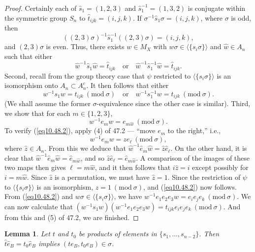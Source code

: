 \documentclass{surv-l}
\numberwithin{equation}{section}
\numberwithin{table}{section}
\numberwithin{figure}{section}
\newtheorem{lemma}[equation]{Lemma}
\theoremstyle{definition}
\begin{document}
\begin{proof}Certainly each of $\widehat{s}_{1}=(1,2,3)$ and
$\widehat{s}_{1}^{-1}=(1,3,2)$ is conjugate within the symmetric
group $S_{n}$ to $\widehat{t}_{ijk}=(i,j, k)$. If
$\sigma^{-1}\widehat{s}_{1}\sigma=(i, j, k)$, where $\sigma$ is
odd, then
\[
((2,3)\sigma)^{-1}\widehat{s}_{1}^{-1}((2,3)\sigma)=(i,j, k),
\]
and $(2,3)\sigma$ is even. Thus, there exists $w\in M_{X}$ with $
w\sigma\in\langle\{s_{i}\sigma\}\rangle$ and $\widehat{w}\in
A_{n}$ such that either
\[
\widehat{w}^{-1}\widehat{s}_{1}\widehat{w}=\widehat{t}_{ijk}\quad \mathrm{or}\quad \widehat{w}^{-1}
\widehat{s}_{1}^{-1}\widehat{w}=\widehat{t}_{ijk}.
\]
Second, recall from the group theory case that $\psi$ restricted
to $\langle\{s_{i}\sigma\}\rangle$ is an isomorphism onto
$A_{n}\subset A_{n}^{c}$. It then follows that either
\[
w^{-1}s_{1}w=t_{ijk}\ (\mathrm{mod}\ \sigma)\quad \mathrm{or}\quad w^{-1}s_{1}^{-1}w=t_{ijk}\ (\mathrm{mod}\ \sigma).
\]
(We shall assume the former $\sigma$-equivalence since the other
case is similar). Third, we show that for each $m\in\{1,2,3\}$,
\begin{equation}\label{eq10.48.2}
 w^{-1}e_{m}w=e_{m\widehat{w}}\ (\mathrm{mod}\ \sigma).
\end{equation}
To verify (\ref{eq10.48.2}), apply (4) of 47.2 --- ``move $e_{m}$
to the right,'' i.e.,
\[
w^{-1}e_{m}w=ze_{\ell}\ (\mathrm{mod}\ \sigma),
\]
where $\widehat{z}\in A_{n}$. From this we deduce that
$\widehat{w}^{-1}\widehat{e}_{m}\widehat{w}=\widehat{z}\widehat{e}_{\ell}$.
On the other hand, it is clear that
$\widehat{w}^{-1}\widehat{e}_{m}\widehat{w}=\widehat{e}_{m\widehat{w}}$,
and so $\widehat{z}\widehat{e}_{\ell}=\widehat{e}_{m\widehat{w}}$.
A comparison of the images of these two maps then gives
$\ell=m\widehat{w}$, and it then follows that $i\widehat{z}=i$
except possibly for $i=m\widehat{w}$. Since $\widehat{z}$ is a
permutation, we must have $\widehat{z}=1$. Since the restriction
of $\psi$ to $\langle\{s_{i}\sigma\}\rangle$ is an isomorphism,
$z=1\ (\mathrm{mod}\ \sigma)$, and (\ref{eq10.48.2}) now follows.
From (\ref{eq10.48.2}) and
$w\sigma\in\langle\{s_{i}\sigma\}\rangle$, we have
$w^{-1}e_{1}e_{2}e_{3}w= e_{i}e_{j}e_{k}\ (\mathrm{mod}\ \sigma)$.
We can now calculate that $(w^{-1}s_{1}w)(w^{-1}e_{1}e_{2}e_{3}w)=
t_{ijk}e_{i}e_{j}e_{k}\ (\mathrm{mod}\ \sigma)$. And from this and
(5) of 47.2, we are finished.
\end{proof}

\begin{lemma}\label{lem10.48.3}
Let $t$ and $t_{0}$ be products of elements in $\{s_{1},\ldots,
s_{n-2}\}$. Then
$\widehat{t}\widehat{e}_{B}=\widehat{t}_{0}\widehat{e}_{B}$
implies $(te_{B}, t_{0}e_{B})\in\sigma$.
\end{lemma}
\end{document}
